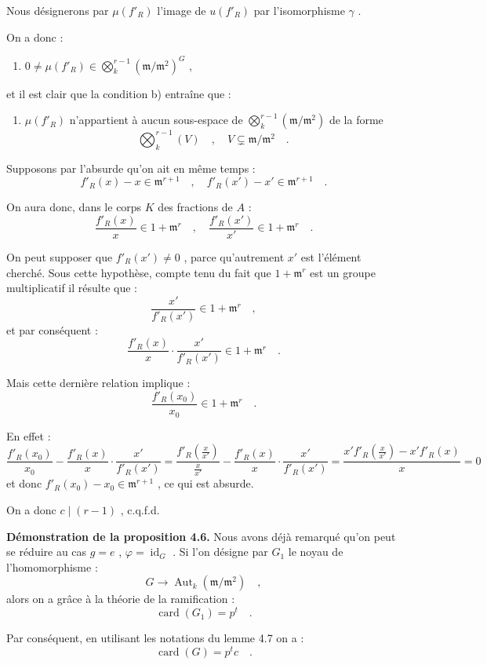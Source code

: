 \documentclass[11pt]{article}
\providecommand{\fm}{\mathfrak{m}}
\providecommand{\id}{\operatorname{id}}
\providecommand{\id}{\operatorname{id}}
\providecommand{\id}{\operatorname{id}}
\providecommand{\Aut}{\operatorname{Aut}}
\providecommand{\id}{\operatorname{id}}
\providecommand{\id}{\operatorname{id}}
\providecommand{\fm}{\mathfrak m}
\providecommand{\card}{\operatorname{card}}
\providecommand{\Aut}{\operatorname{Aut}}
\begin{document}
Nous désignerons par $\mu(f'_R)$ l'image de $u(f'_R)$ par l'isomorphisme $\gamma$ .

On a donc :
\begin{enumerate}
\item[1)] $0 \neq \mu(f'_R) \in \bigotimes_k^{r-1}(\fm/\fm^2)^G$ ,
\end{enumerate}
et il est clair que la condition b) entraîne que :
\begin{enumerate}
\item[2)] $\mu(f'_R)$ n'appartient à aucun sous-espace de $\bigotimes_k^{r-1}(\fm/\fm^2)$ de la forme
\[
\bigotimes_k^{r-1}(V) \quad , \quad V \subsetneq \fm/\fm^2 \quad .
\]
\end{enumerate}

Supposons par l'absurde qu'on ait en même temps :
\[
f'_R(x) - x \in \fm^{r+1} \quad , \quad f'_R(x') - x' \in \fm^{r+1} \quad .
\]

On aura donc, dans le corps $K$ des fractions de $A$ :
\[
\frac{f'_R(x)}{x} \in 1 + \fm^r \quad , \quad \frac{f'_R(x')}{x'} \in 1 + \fm^r \quad .
\]

On peut supposer que $f'_R(x') \neq 0$ , parce qu'autrement $x'$ est l'élément cherché. Sous cette hypothèse, compte tenu du fait que $1 + \fm^r$ est un groupe multiplicatif il résulte que :
\[
\frac{x'}{f'_R(x')} \in 1 + \fm^r \quad ,
\]
et par conséquent :
\[
\frac{f'_R(x)}{x} \cdot \frac{x'}{f'_R(x')} \in 1 + \fm^r \quad .
\]

Mais cette dernière relation implique :
\[
\frac{f'_R(x_0)}{x_0} \in 1 + \fm^r \quad .
\]

En effet :
\[
\frac{f'_R(x_0)}{x_0} - \frac{f'_R(x)}{x} \cdot \frac{x'}{f'_R(x')} = \frac{f'_R(\frac{x}{x'})}{\frac{x}{x'}} - \frac{f'_R(x)}{x} \cdot \frac{x'}{f'_R(x')} = \frac{x' f'_R(\frac{x}{x'}) - x' f'_R(x)}{x} = 0
\]
et donc $f'_R(x_0) - x_0 \in \fm^{r+1}$ , ce qui est absurde.

On a donc $c \mid (r-1)$ , c.q.f.d.

\medskip

\noindent
\textbf{Démonstration de la proposition 4.6.} Nous avons déjà remarqué qu'on peut se réduire au cas $g = e$ , $\varphi = \id_G$ . Si l'on désigne par $G_1$ le noyau de l'homomorphisme :
\[
G \longrightarrow \Aut_k(\fm/\fm^2) \quad ,
\]
alors on a grâce à la théorie de la ramification :
\[
\card(G_1) = p^t \quad .
\]

Par conséquent, en utilisant les notations du lemme 4.7 on a :
\[
\card(G) = p^t c \quad .
\]
\end{document}
